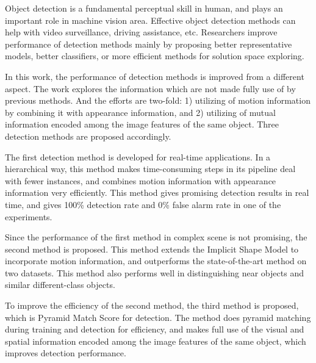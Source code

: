 \begin{eabstract}


Object detection is a fundamental perceptual skill in human, and plays an important role in machine vision area. Effective object detection methods can help with video surveillance, driving assistance, etc. Researchers improve performance of detection methods mainly by proposing better representative models, better classifiers, or more efficient methods for  solution space exploring.

In this work, the performance of detection methods is improved from a different aspect. The work explores the information which are not made fully use of by previous methods. And the efforts are two-fold: 1) utilizing of motion information by combining it   with appearance information, and 2) utilizing of mutual information encoded among the image features of the same object. Three detection methods are proposed accordingly.

The first detection method is developed for real-time applications. In a hierarchical way, this method makes time-consuming steps in its pipeline deal with fewer instances, and combines motion information with appearance information very efficiently. This method gives promising detection results in real time, and gives 100\% detection rate and 0\% false alarm rate in one of the experiments.

Since the performance of the first method in complex scene is not promising, the second method is proposed. This method extends the Implicit Shape Model to incorporate motion information, and outperforms the state-of-the-art method on two datasets. This method also performs well in distinguishing near objects and similar different-class objects.

To improve the efficiency of the second method, the third method is proposed, which is Pyramid Match Score for detection. The method does pyramid matching during training and detection for efficiency, and makes full use of the visual and spatial  information encoded among the image features of the same object, which improves detection performance.
\end{eabstract}



